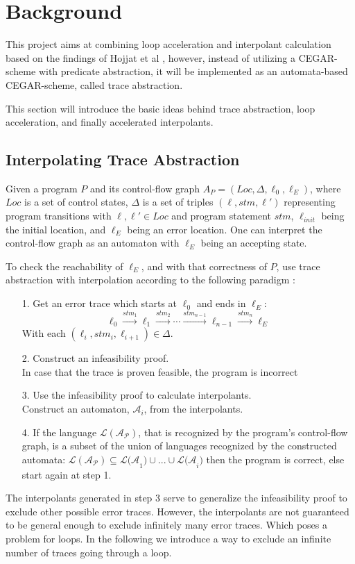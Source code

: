 \documentclass{article}
\begin{document}
\section{Background}
This project aims at combining loop acceleration and interpolant calculation based on the findings of Hojjat et al \cite{10.1007/978-3-642-33386-6_16}, however, instead of utilizing a CEGAR-scheme with predicate abstraction, it will be implemented as an automata-based CEGAR-scheme, called trace abstraction. \par
This section will introduce the basic ideas behind trace abstraction, loop acceleration, and finally accelerated interpolants.

\subsection{Interpolating Trace Abstraction}
Given a program $P$ and its control-flow graph $A_P = (Loc, \Delta, \ell_{0}, \ell_E)$, where $Loc$ is a set of control states, $\Delta$ is a set of triples $(\ell, stm, \ell')$ representing program transitions with $\ell, \ell' \in Loc$ and program statement $stm$, $\ell_{init}$ being the initial location, and $\ell_E$ being an error location. One can interpret the control-flow graph as an automaton with $\ell_E$ being an accepting state. \par To check the reachability of $\ell_E$, and with that correctness of $P$, use trace abstraction with interpolation according to the following paradigm \cite{10.1007/978-3-642-03237-0_7}:
\begin{itemize}
	\item[1.] Get an error trace which starts at $\ell_0$ and ends in $\ell_E$:
	\begin{equation*}
			 \ell_{0} \xrightarrow{\text{$stm_1$}} \ell_1 \xrightarrow{\text{$stm_2$}} \cdots \xrightarrow{\text{$stm_{n-1}$}} \ell_{n-1} \xrightarrow{\text{$stm_{n}$}} \ell_{E}
	\end{equation*}
	With each $(\ell_i, stm_i, \ell_{i + 1}) \in \Delta$.
	\item[2.] Construct an infeasibility proof. \\ In case that the trace is proven feasible, the program is incorrect
	\item[3.] Use the infeasibility proof to calculate interpolants. \\
	Construct an automaton, $\mathcal{A}_i$, from the interpolants.
	\item[4.] If the language $\mathcal{L(A_P)}$, that is recognized by the program's control-flow graph, is a subset of the union of languages recognized by the constructed automata: $\mathcal{L(A_P)} \subseteq \mathcal{L(A}_1) \cup ... \cup \mathcal{L(A}_i)$ then the program is correct, else start again at step 1.
\end{itemize}
The interpolants generated in step 3 serve to generalize the infeasibility proof to exclude other possible error traces. However, the interpolants are not guaranteed to be general enough to exclude infinitely many error traces. Which poses a problem for loops. In the following we introduce a way to exclude an infinite number of traces going through a loop.
\end{document}
